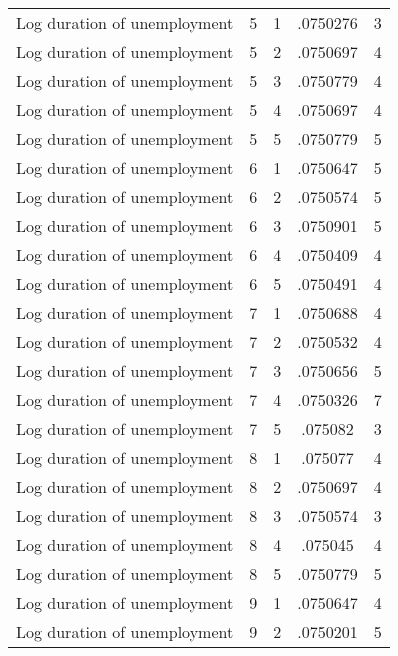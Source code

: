 \begin{tabular}{l*{4}{c}}
Log duration of unemployment&           5&           1&    .0750276&           3\\
Log duration of unemployment&           5&           2&    .0750697&           4\\
Log duration of unemployment&           5&           3&    .0750779&           4\\
Log duration of unemployment&           5&           4&    .0750697&           4\\
Log duration of unemployment&           5&           5&    .0750779&           5\\
Log duration of unemployment&           6&           1&    .0750647&           5\\
Log duration of unemployment&           6&           2&    .0750574&           5\\
Log duration of unemployment&           6&           3&    .0750901&           5\\
Log duration of unemployment&           6&           4&    .0750409&           4\\
Log duration of unemployment&           6&           5&    .0750491&           4\\
Log duration of unemployment&           7&           1&    .0750688&           4\\
Log duration of unemployment&           7&           2&    .0750532&           4\\
Log duration of unemployment&           7&           3&    .0750656&           5\\
Log duration of unemployment&           7&           4&    .0750326&           7\\
Log duration of unemployment&           7&           5&     .075082&           3\\
Log duration of unemployment&           8&           1&     .075077&           4\\
Log duration of unemployment&           8&           2&    .0750697&           4\\
Log duration of unemployment&           8&           3&    .0750574&           3\\
Log duration of unemployment&           8&           4&     .075045&           4\\
Log duration of unemployment&           8&           5&    .0750779&           5\\
Log duration of unemployment&           9&           1&    .0750647&           4\\
Log duration of unemployment&           9&           2&    .0750201&           5\\

\end{tabular}
